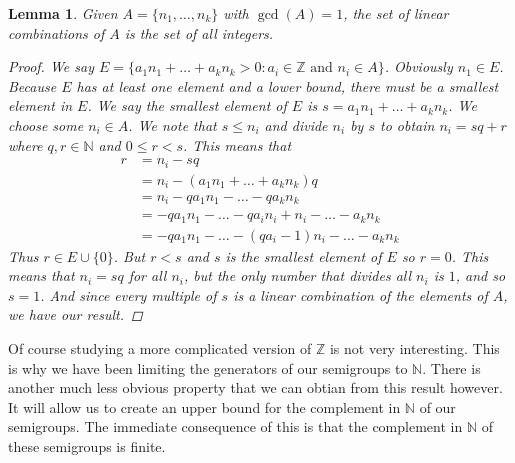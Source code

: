 \documentclass[11pt]{amsart}
\theoremstyle{plain}
\newtheorem{lemma}{Lemma}
\theoremstyle{definition}
\begin{document}
\begin{lemma}
  Given $A=\{n_1,\dots,n_k\}$ with $\gcd(A)=1$, the set of linear
  combinations of $A$ is the set of all integers.
  \begin{proof}
    We say $E=\{a_1n_1+\dots+a_kn_k>0:a_i\in \mathbb{Z}\text{ and }n_i\in A\}$.
    Obviously $n_1\in E$. Because $E$ has at least one element and a lower
    bound, there must be a smallest element in $E$. We say the smallest element
    of $E$ is $s=a_1n_1+\dots+a_kn_k$. We choose some $n_i\in A$. We note that
    $s\le n_i$ and divide $n_i$ by $s$ to obtain $n_i=sq+r$ where
    $q,r\in \mathbb{N}$ and $0\le r<s$. This means that
    \begin{align*}
      r&=n_i-sq\\
      &=n_i-(a_1n_1+\dots+a_kn_k)q\\
      &=n_i-qa_1n_1-\dots-qa_kn_k\\
      &=-qa_1n_1-\dots-qa_in_i+n_i-\dots-a_kn_k\\
      &=-qa_1n_1-\dots-(qa_i-1)n_i-\dots-a_kn_k
    \end{align*}
    Thus $r\in E\cup \{0\}$. But $r<s$ and $s$ is the smallest element of $E$ so
    $r=0$. This means that $n_i=sq$ for all $n_i$, but the only number that
    divides all $n_i$ is $1$, and so $s=1$. And since every multiple of $s$ is
    a linear combination of the elements of $A$, we have our result.
  \end{proof}
\end{lemma}
Of course studying a more complicated version of $\mathbb{Z}$ is not very
interesting. This is why we have been limiting the generators of our semigroups
to $\mathbb{N}$. There is another much less obvious property that we can obtian
from this result however. It will allow us to create an upper bound for the
complement in $\mathbb{N}$ of our semigroups. The immediate consequence of this
is that the complement in $\mathbb{N}$ of these semigroups is finite.
\end{document}
